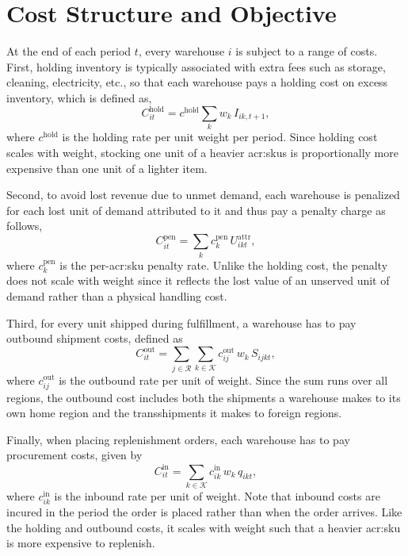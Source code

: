 \section{Cost Structure and Objective}
\label{sec:costs}
At the end of each period $t$, every warehouse $i$ is subject to a range of costs. First, holding inventory is typically associated with extra fees such as storage, cleaning, electricity, etc., so that each warehouse pays a holding cost on excess inventory, which is defined as,  
\begin{equation}
\label{eq:holding-cost}
  C^{\mathrm{hold}}_{it} = c^{\mathrm{hold}} \sum_k w_k\, I_{ik,t+1},
\end{equation}
where $c^{\mathrm{hold}}$ is the holding rate per unit weight per period. Since holding cost scales with weight, stocking one unit of a heavier \glspl{acr:sku} is proportionally more expensive than one unit of a lighter item.

Second, to avoid lost revenue due to unmet demand, each warehouse is penalized for each lost unit of demand attributed to it and thus pay a penalty charge as follows,
\begin{equation}
\label{eq:penalty-cost}
  C^{\mathrm{pen}}_{it} = \sum_k c^{\mathrm{pen}}_k\, U^{\mathrm{attr}}_{ikt},
\end{equation}
where $c^{\mathrm{pen}}_k$ is the per-\gls{acr:sku} penalty rate. Unlike the holding cost, the penalty does not scale with weight since it reflects the lost value of an unserved unit of demand rather than a physical handling cost.

Third, for every unit shipped during fulfillment, a warehouse has to pay outbound shipment costs, defined as
\begin{equation}
\label{eq:outbound-cost}
  C^{\mathrm{out}}_{it} = \sum_{j \in \mathcal{R}} \sum_{k \in \mathcal{K}}
  c^{\mathrm{out}}_{ij} \, w_k \, S_{ijkt},
\end{equation}
where $c^{\mathrm{out}}_{ij}$ is the outbound rate per unit of weight. Since the sum runs over all regions, the outbound cost includes both the shipments a warehouse makes to its own home region and the transshipments it makes to foreign regions.

Finally, when placing replenishment orders, each warehouse has to pay procurement costs, given by
\begin{equation}
\label{eq:inbound-cost}
  C^{\mathrm{in}}_{it} = \sum_{k \in \mathcal{K}} c^{\mathrm{in}}_{ik} \, w_k \,
  q_{ikt},
\end{equation}
where $c^{\mathrm{in}}_{ik}$ is the inbound rate per unit of weight. Note that inbound costs are incured in the period the order is placed rather than when the order arrives. Like the holding and outbound costs, it scales with weight such that a heavier \gls{acr:sku} is more expensive to replenish.

